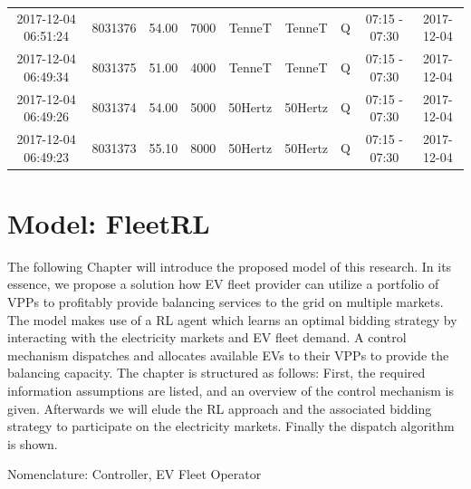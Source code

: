 \documentclass[a4paper, 12pt]{article}
\begin{document}
{\begin{table}
\begin{tabular}{c|cccccccc}
2017-12-04 06:51:24 & 8031376 & 54.00 & 7000 & TenneT & TenneT & Q & 07:15 - 07:30 & 2017-12-04\\
2017-12-04 06:49:34 & 8031375 & 51.00 & 4000 & TenneT & TenneT & Q & 07:15 - 07:30 & 2017-12-04\\
2017-12-04 06:49:26 & 8031374 & 54.00 & 5000 & 50Hertz & 50Hertz & Q & 07:15 - 07:30 & 2017-12-04\\
2017-12-04 06:49:23 & 8031373 & 55.10 & 8000 & 50Hertz & 50Hertz & Q & 07:15 - 07:30 & 2017-12-04\\
\hline
\hline
\end{tabular}
\end{table}
}

\section{Model: FleetRL}
\label{sec:org5ba5199}
The following Chapter will introduce the proposed model of this research. In its
essence, we propose a solution how EV fleet provider can utilize a portfolio of
VPPs to profitably provide balancing services to the grid on multiple markets.
The model makes use of a RL agent which learns an optimal bidding strategy by
interacting with the electricity markets and EV fleet demand. A control
mechanism dispatches and allocates available EVs to their VPPs to provide the
balancing capacity. The chapter is structured as follows: First, the required
information assumptions are listed, and an overview of the control mechanism is
given. Afterwards we will elude the RL approach and the associated bidding
strategy to participate on the electricity markets. Finally the dispatch
algorithm is shown.

Nomenclature: Controller, EV Fleet Operator
\end{document}
